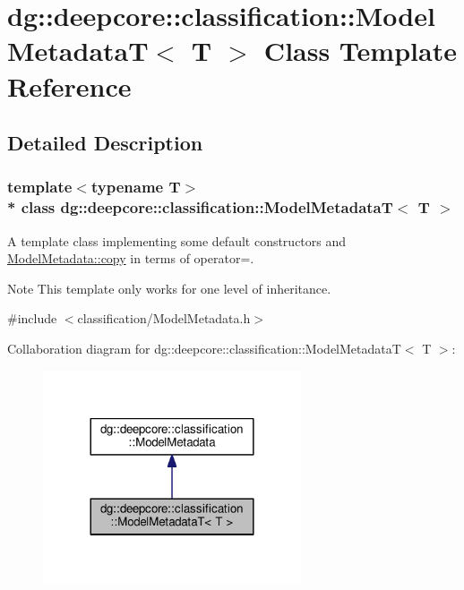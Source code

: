 \hypertarget{classdg_1_1deepcore_1_1classification_1_1_model_metadata_t}{}\section{dg\+:\+:deepcore\+:\+:classification\+:\+:Model\+MetadataT$<$ T $>$ Class Template Reference}
\label{classdg_1_1deepcore_1_1classification_1_1_model_metadata_t}


\subsection{Detailed Description}
\subsubsection*{template$<$typename T$>$\\*
class dg\+::deepcore\+::classification\+::\+Model\+Metadata\+T$<$ T $>$}

A template class implementing some default constructors and \hyperlink{group___classification_module_ga851d179b56e5c32b25512df0141f3ca2}{Model\+Metadata\+::copy} in terms of operator=. 

\begin{DoxyNote}{Note}
This template only works for one level of inheritance. 
\end{DoxyNote}


{\ttfamily \#include $<$classification/\+Model\+Metadata.\+h$>$}



Collaboration diagram for dg\+:\+:deepcore\+:\+:classification\+:\+:Model\+MetadataT$<$ T $>$\+:
\nopagebreak
\begin{figure}[H]
\begin{center}
\leavevmode
\includegraphics[width=216pt]{classdg_1_1deepcore_1_1classification_1_1_model_metadata_t__coll__graph}
\end{center}
\end{figure}
